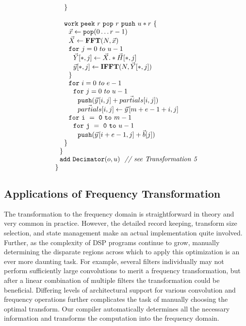 \begin{transformation}
\begin{equation}
\begin{array}{ll}
    ~~~~{\tt \}} \\
    \\
    ~~~~{\tt work}~{\tt peek}~r~{\tt pop}~r~{\tt push}~u*r~{\tt \{} \\
    ~~~~~~\vec{x} \leftarrow {\tt pop}(0 \dots r-1) \\
    ~~~~~~\vec{X} \leftarrow \mathbf{FFT} (N, \vec{x}) \\
    ~~~~~~{\tt for}~j=0~to~u-1\\
    ~~~~~~~~\vec{Y}[*,j] \leftarrow \vec{X} .* \vec{H}[*,j] \\
    ~~~~~~~~\vec{y}[*,j] \leftarrow \mathbf{IFFT}(N, \vec{Y}[*,j]) \\
    ~~~~~~{\tt \}} \\
    ~~~~~~{\tt for}~i=0~to~e-1\\
    ~~~~~~~~{\tt for}~j=0~to~u-1\\
    ~~~~~~~~~~{\tt push}(\vec{y}\hspace{1pt}[i,j] + \vec{partials}[i,j])\\
    ~~~~~~~~~~\vec{partials}[i,j] \leftarrow \vec{y}\hspace{1pt}[m+e-1+i,j]\\
    ~~~~~~{\tt for~i~=~0~to~}m-1\\
    ~~~~~~~~{\tt for~j~=~0~to~}u-1\\
    ~~~~~~~~~~{\tt push}(\vec{y}\hspace{1pt}[i+e-1,j] + {\vec b}[j])\\
    ~~~~{\tt \}} \\
    ~~{\tt \}} \\
    ~~{\tt add~Decimator}(o, u)~~\mbox{\it // see Transformation 5}\\
    {\tt \}} \\
  \end{array}
\end{equation}
\label{trans:freq1}
\end{transformation}

\subsection{Applications of Frequency Transformation}

The transformation to the frequency domain is straightforward in
theory and very common in practice. However, the detailed record
keeping, transform size selection, and state management make an actual
implementation quite involved.  Further, as the complexity of DSP
programs continue to grow, manually determining the disparate regions
across which to apply this optimization is an ever more daunting task.
For example, several filters individually may not perform sufficiently
large convolutions to merit a frequency transformation, but after a
linear combination of multiple filters the transformation could be
beneficial.  Differing levels of architectural support for various
convolution and frequency operations further complicates the task of
manually choosing the optimal transform.  Our compiler automatically
determines all the necessary information and transforms the
computation into the frequency domain.

